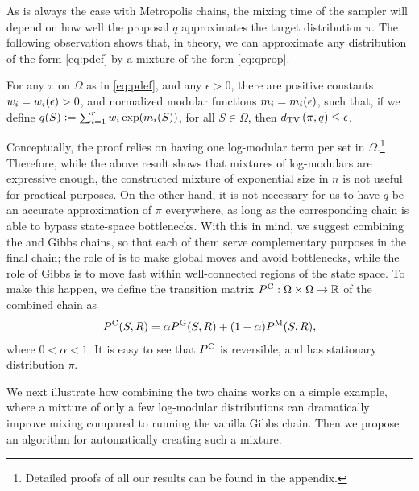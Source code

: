 As is always the case with Metropolis chains, the mixing time of the \Ms{} sampler will depend on how well the proposal $q$ approximates the target distribution $\pi$.
The following observation shows that, in theory, we can approximate any distribution of the form \eqref{eq:pdef} by a mixture of the form \eqref{eq:qprop}.

\begin{prop} \label{prop:decomp}
  For any $\pi$ on $\Omega$ as in \eqref{eq:pdef}, and any $\epsilon > 0$, there are positive constants $w_i = w_i(\epsilon) > 0$, and normalized modular functions $m_i = m_i(\epsilon)$, such that, if we define $q(S) \vcentcolon= \sum_{i = 1}^r w_i \exp(m_i(S))$, for all $S \in \Omega$, then $d_{\textrm{TV}}\left( \pi, q \right) \leq \epsilon$.
\end{prop}
Conceptually, the proof relies on having one log-modular term per set in $\Omega$.\footnote{Detailed proofs of all our results can be found in the appendix.}
Therefore, while the above result shows that mixtures of log-modulars are expressive enough, the constructed mixture of exponential size in $n$ is not useful for practical purposes.
On the other hand, it is not necessary for us to have $q$ be an accurate approximation of $\pi$ everywhere, as long as the corresponding \Ms{} chain is able to bypass state-space bottlenecks.
With this in mind, we suggest combining the \Ms{} and Gibbs chains, so that each of them serve complementary purposes in the final chain; the role of \Ms{} is to make global moves and avoid bottlenecks, while the role of Gibbs is to move fast within well-connected regions of the state space.
To make this happen, we define the transition matrix $P^{\mathrm{C}} : \Omega \times \Omega \to \mathbb{R}$ of the combined chain as
\begin{align} \label{eq:cdef}
  P^{\mathrm{C}}(S, R) = \alpha P^{\mathrm{G}}(S, R) + (1-\alpha)P^{\mathrm{M}}(S, R),
\end{align}
where $0 < \alpha < 1$.
It is easy to see that $P^{\mathrm{C}}$ is reversible, and has stationary distribution $\pi$.

We next illustrate how combining the two chains works on a simple example, where a mixture of only a few log-modular distributions can dramatically improve mixing compared to running the vanilla Gibbs chain.
Then %
we propose an algorithm for automatically creating such a mixture.

